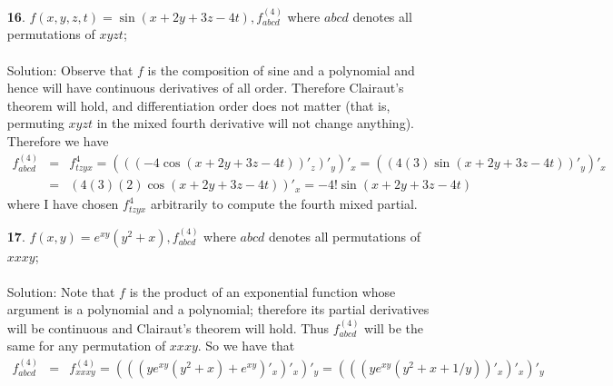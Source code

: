 \documentclass[12pt]{amsbook}
\begin{document}
\begin{enumerate}
\\
\\
{\sc Solution}: First, $f$ is the product of sine and the exponential function, which have continuous derivatives of all orders. Moreover, the argument of the sine part is a polynomial and also has continuous derivatives of all orders. Therefore Clairaut's theorem will hold and $f^{(4)}_{xyzz}= f^{(4)}_{zyxz}=f^{(4)}_{zxzy}$. Next, note that $f(x,y,z)$ can be written as $f(x,y,z)=g(x,y)h(z)$; this will make our calculations easier. For example, $f^{(4)}_{xyzz}=g''_{xy}h''_{zz}$, since $h$ is constant with respect to $x,y$ and $g$ is constant with respect to $z$. Therefore we have
\begin{eqnarray*}
\frac{\partial f^5}{\partial z^5}&=&g(x,y)h^{(5)}_{zzzzz}=\sin(xy)e^z \\
f^{(4)}_{zyxz}&=&f^{(4)}_{zxzy}=f^{(4)}_{xyzz}=g''_{xy}h''_{zz}=(y\cos(xy))'_ye^z=(\cos(xy)-xy\sin(xy))e^z
\end{eqnarray*}
\item[{\small\bf 16}.] $f(x,y,z,t)=\sin(x+2y+3z-4t), f^{(4)}_{abcd}$ where $abcd$ denotes all permutations of $xyzt$;
\\
\\
{\sc Solution}: Observe that $f$ is the composition of sine and a polynomial and hence will have continuous derivatives of all order. Therefore Clairaut's theorem will hold, and differentiation order does not matter (that is, permuting $xyzt$ in the mixed fourth derivative will not change anything). Therefore we have
\begin{eqnarray*}
f^{(4)}_{abcd}&=&f^{4}_{tzyx}=(((-4\cos(x+2y+3z-4t))'_z)'_y)'_x=((4(3)\sin(x+2y+3z-4t))'_y)'_x \\
&=&(4(3)(2)\cos(x+2y+3z-4t))'_x=-4!\sin(x+2y+3z-4t)
\end{eqnarray*}
where I have chosen $f^{4}_{tzyx}$ arbitrarily to compute the fourth mixed partial.
\\
\item[{\small\bf 17}.] $f(x,y)=e^{xy}(y^2+x), f^{(4)}_{abcd}$ where $abcd$ denotes all permutations of $xxxy$;
\\
\\
{\sc Solution}: Note that $f$ is the product of an exponential function whose argument is a polynomial and a polynomial; therefore its partial derivatives will be continuous and Clairaut's theorem will hold. Thus $f^{(4)}_{abcd}$ will be the same for any permutation of $xxxy$. So we have that
\begin{eqnarray*}
f^{(4)}_{abcd}&=&f^{(4)}_{xxxy}=(((ye^{xy}(y^2+x)+e^{xy})'_x)'_x)'_y=(((ye^{xy}(y^2+x+1/y))'_x)'_x)'_y \\

\end{eqnarray*}
\end{enumerate}
\end{document}
